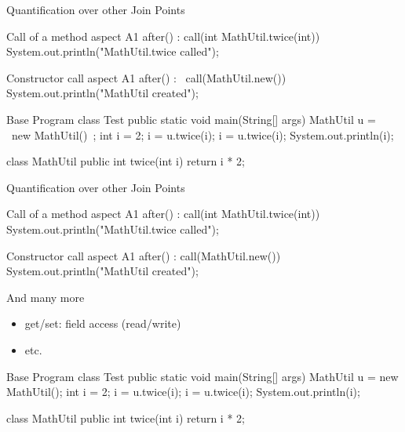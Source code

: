 \begin{frame}[fragile]{Quantification over other Join Points}
	\begin{fancycolumns}[animation=none]
\begin{codetight}{Call of a method}
aspect A1 {
	after() : call(int MathUtil.twice(int)) {
		System.out.println("MathUtil.twice called");
	}
}
\end{codetight}
\begin{codetight}{Constructor call}
aspect A1 {
	after() : ~call(MathUtil.new())~ {
		System.out.println("MathUtil created");
	}
}
\end{codetight}
	\nextcolumn
\begin{codetight}{Base Program}
class Test {
	public static void main(String[] args) {
		MathUtil u = ~new MathUtil()~;
		int i = 2;
		i = u.twice(i);
		i = u.twice(i);
		System.out.println(i);
	}
}

class MathUtil {
	public int twice(int i) {
		return i * 2;
	}
}
\end{codetight}	
	\end{fancycolumns}
\end{frame}

\begin{frame}[fragile]{Quantification over other Join Points}
	\begin{fancycolumns}[animation=none]
\begin{codetight}{Call of a method}
aspect A1 {
	after() : call(int MathUtil.twice(int)) {
		System.out.println("MathUtil.twice called");
	}
}
\end{codetight}
\begin{codetight}{Constructor call}
aspect A1 {
	after() : call(MathUtil.new()) {
		System.out.println("MathUtil created");
	}
}
\end{codetight}
		\begin{note}{And many more}
			\begin{itemize}
				\item get/set: field access (read/write)
				\item etc.
			\end{itemize}
		\end{note}
	\nextcolumn
\begin{codetight}{Base Program}
class Test {
	public static void main(String[] args) {
		MathUtil u = new MathUtil();
		int i = 2;
		i = u.twice(i);
		i = u.twice(i);
		System.out.println(i);
	}
}

class MathUtil {
	public int twice(int i) {
		return i * 2;
	}
}
\end{codetight}	
	\end{fancycolumns}
\end{frame}

